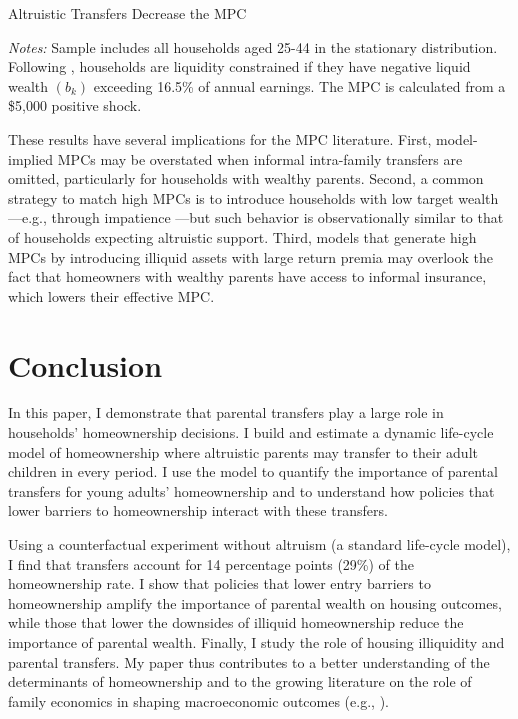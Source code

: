 \documentclass[12pt]{article}
\begin{document}
\begin{table}[tb]
	\center\singlespacing	
	\begin{threeparttable}[tb]
		\caption{Altruistic Transfers Decrease the MPC}
		
	\end{threeparttable}
	{\begin{footnotesize}\begin{flushleft}\vspace{-0.1in}
		\textit{Notes:} Sample includes all households aged 25-44 in the stationary distribution. Following \cite{Kaplan2014}, households are liquidity constrained if they have negative liquid wealth $(b_k)$ exceeding 16.5\% of annual earnings. The MPC is calculated from a \$5,000 positive shock.\end{flushleft}\end{footnotesize}}			
\end{table}

These results have several implications for the MPC literature. First, model-implied MPCs may be overstated when informal intra-family transfers are omitted, particularly for households with wealthy parents. Second, a common strategy to match high MPCs is to introduce households with low target wealth—e.g., through impatience \citep{aguiar2024hand}—but such behavior is observationally similar to that of households expecting altruistic support. Third, models that generate high MPCs by introducing illiquid assets with large return premia \citep{kaplan2022marginal} may overlook the fact that homeowners with wealthy parents have access to informal insurance, which lowers their effective MPC. 

\section{Conclusion}
In this paper, I demonstrate that parental transfers play a large role in households' homeownership decisions. I build and estimate a dynamic life-cycle model of homeownership where altruistic parents may transfer to their adult children in every period. I use the model to quantify the importance of parental transfers for young adults' homeownership and to understand how policies that lower barriers to homeownership interact with these transfers.

Using a counterfactual experiment without altruism (a standard life-cycle model), I find that transfers account for 14 percentage points (29\%) of the homeownership rate. I show that policies that lower entry barriers to homeownership amplify the importance of parental wealth on housing outcomes, while those that lower the downsides of illiquid homeownership reduce the importance of parental wealth. Finally, I study the role of housing illiquidity and parental transfers. My paper thus contributes to a better understanding of the determinants of homeownership and to the growing literature on the role of family economics in shaping macroeconomic outcomes (e.g., \cite{Doepke2016a,Daruich2018}).
\end{document}
